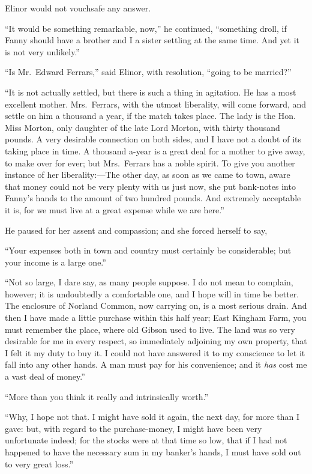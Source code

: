\documentclass{article}
\begin{document}
Elinor would not vouchsafe any answer.

``It would be something remarkable, now,'' he continued,
``something droll, if Fanny should have a brother and I
a sister settling at the same time.  And yet it is not
very unlikely.''

``Is Mr.\ Edward Ferrars,'' said Elinor, with resolution,
``going to be married?''

``It is not actually settled, but there is such
a thing in agitation.  He has a most excellent mother.
Mrs.\ Ferrars, with the utmost liberality, will come forward,
and settle on him a thousand a year, if the match
takes place.  The lady is the Hon. Miss Morton, only daughter
of the late Lord Morton, with thirty thousand pounds.
A very desirable connection on both sides, and I have not
a doubt of its taking place in time.  A thousand a-year
is a great deal for a mother to give away, to make over
for ever; but Mrs.\ Ferrars has a noble spirit.  To give
you another instance of her liberality:---The other day,
as soon as we came to town, aware that money could
not be very plenty with us just now, she put bank-notes
into Fanny's hands to the amount of two hundred pounds.
And extremely acceptable it is, for we must live at a great
expense while we are here.''

He paused for her assent and compassion; and she
forced herself to say,

``Your expenses both in town and country must certainly
be considerable; but your income is a large one.''

``Not so large, I dare say, as many people suppose.
I do not mean to complain, however; it is undoubtedly
a comfortable one, and I hope will in time be better.
The enclosure of Norland Common, now carrying on,
is a most serious drain.  And then I have made a little
purchase within this half year; East Kingham Farm,
you must remember the place, where old Gibson used to live.
The land was so very desirable for me in every respect,
so immediately adjoining my own property, that I felt it
my duty to buy it.  I could not have answered it to my
conscience to let it fall into any other hands.  A man must
pay for his convenience; and it \emph{has} cost me a vast deal
of money.''

``More than you think it really and intrinsically worth.''

``Why, I hope not that.  I might have sold it again,
the next day, for more than I gave: but, with regard to the
purchase-money, I might have been very unfortunate indeed;
for the stocks were at that time so low, that if I had not
happened to have the necessary sum in my banker's hands,
I must have sold out to very great loss.''
\end{document}
